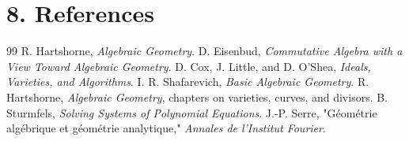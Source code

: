 \section*{8. References}
\begin{thebibliography}{99}
 R. Hartshorne, \emph{Algebraic Geometry}.
 D. Eisenbud, \emph{Commutative Algebra with a View Toward Algebraic Geometry}.
 D. Cox, J. Little, and D. O'Shea, \emph{Ideals, Varieties, and Algorithms}.
 I. R. Shafarevich, \emph{Basic Algebraic Geometry}.
 R. Hartshorne, \emph{Algebraic Geometry}, chapters on varieties, curves, and divisors.
 B. Sturmfels, \emph{Solving Systems of Polynomial Equations}.
 J.-P. Serre, "Géométrie algébrique et géométrie analytique," \emph{Annales de l'Institut Fourier}.
\end{thebibliography}
